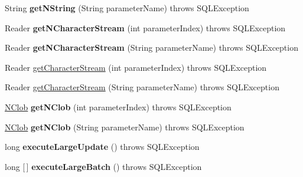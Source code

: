 \begin{DoxyCompactItemize}
\item 
\mbox{\label{classcom_1_1mysql_1_1cj_1_1jdbc_1_1_callable_statement_a4fea844e754c85efb3d18a86f5548e34}} 
String {\bfseries get\+N\+String} (String parameter\+Name)  throws S\+Q\+L\+Exception 
\item 
\mbox{\label{classcom_1_1mysql_1_1cj_1_1jdbc_1_1_callable_statement_aa96c2194c44ec4082cb2cfb645647062}} 
Reader {\bfseries get\+N\+Character\+Stream} (int parameter\+Index)  throws S\+Q\+L\+Exception 
\item 
\mbox{\label{classcom_1_1mysql_1_1cj_1_1jdbc_1_1_callable_statement_a5dbe870e6f661092ec6985e826602f82}} 
Reader {\bfseries get\+N\+Character\+Stream} (String parameter\+Name)  throws S\+Q\+L\+Exception 
\item 
Reader \mbox{\hyperlink{classcom_1_1mysql_1_1cj_1_1jdbc_1_1_callable_statement_a668c7c8fd31463997dbe10c99a1e5589}{get\+Character\+Stream}} (int parameter\+Index)  throws S\+Q\+L\+Exception 
\item 
Reader \mbox{\hyperlink{classcom_1_1mysql_1_1cj_1_1jdbc_1_1_callable_statement_a5477c18b65f62729d34075e638b5e6de}{get\+Character\+Stream}} (String parameter\+Name)  throws S\+Q\+L\+Exception 
\item 
\mbox{\label{classcom_1_1mysql_1_1cj_1_1jdbc_1_1_callable_statement_a1b4eadf79d2fae5dd876aac322878a6f}} 
\mbox{\hyperlink{classcom_1_1mysql_1_1cj_1_1jdbc_1_1_n_clob}{N\+Clob}} {\bfseries get\+N\+Clob} (int parameter\+Index)  throws S\+Q\+L\+Exception 
\item 
\mbox{\label{classcom_1_1mysql_1_1cj_1_1jdbc_1_1_callable_statement_a65db28a124ce9df471a223c444a9cf22}} 
\mbox{\hyperlink{classcom_1_1mysql_1_1cj_1_1jdbc_1_1_n_clob}{N\+Clob}} {\bfseries get\+N\+Clob} (String parameter\+Name)  throws S\+Q\+L\+Exception 
\item 
\mbox{\label{classcom_1_1mysql_1_1cj_1_1jdbc_1_1_callable_statement_aafb8f4a04b47a44c9eab5c384a1042e0}} 
long {\bfseries execute\+Large\+Update} ()  throws S\+Q\+L\+Exception 
\item 
\mbox{\label{classcom_1_1mysql_1_1cj_1_1jdbc_1_1_callable_statement_a741debe8f395a8e49418ffa5f0996180}} 
long \mbox{[}$\,$\mbox{]} {\bfseries execute\+Large\+Batch} ()  throws S\+Q\+L\+Exception 
\end{DoxyCompactItemize}
